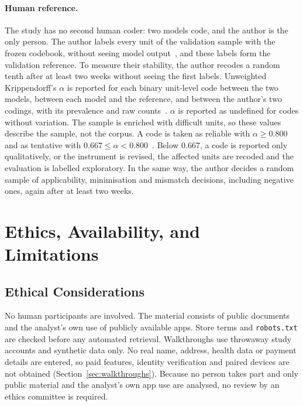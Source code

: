 \paragraph{Human reference.} The study has no second human coder: two models code, and the author
is the only person. The author labels every unit of the validation sample with the frozen
codebook, without seeing model output~\parencite{campbell2013coding,oconnor2020intercoder}, and
these labels form the validation reference. To measure their stability, the author recodes a
random tenth after at least two weeks without seeing the first labels. Unweighted
Krippendorff's $\alpha$ is reported for each binary unit-level code between the two models,
between each model and the reference, and between the author's two codings, with its prevalence
and raw counts~\parencite{feinstein1990high}. $\alpha$ is reported as undefined for codes without
variation. The sample is enriched with difficult units, so these values describe the sample,
not the corpus. A code is taken as reliable with $\alpha\geq0.800$ and as tentative with
$0.667\leq\alpha<0.800$~\parencite[pp.~356--357]{krippendorff2019content}\parencite{mcdonald2019reliability}.
Below 0.667, a code is reported only qualitatively, or the instrument is revised, the affected
units are recoded and the evaluation is labelled exploratory. In the same way,
the author decides a random sample of applicability, minimisation and mismatch decisions,
including negative ones, again after at least two weeks.

\section{Ethics, Availability, and Limitations}
\label{sec:closing}

\subsection{Ethical Considerations}
\label{sec:ethics}
No human participants are involved. The material consists of public documents and the
analyst's own use of publicly available apps. Store terms and \texttt{robots.txt} are checked
before any automated retrieval. Walkthroughs use throwaway study accounts and synthetic data
only. No real name, address, health data or payment details are entered, so paid features,
identity verification and paired devices are not obtained (Section~\ref{sec:walkthroughs}).
Because no person takes part and only public material and the analyst's own app use are
analysed, no review by an ethics committee is required.


